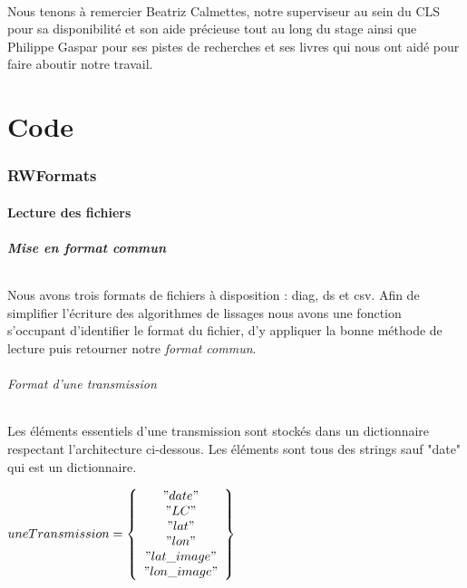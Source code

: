 \documentclass[11p, a4papert]{article}
\begin{document}
\paragraph{}
Nous tenons à remercier Beatriz Calmettes, notre superviseur au sein du CLS pour sa disponibilité et son aide précieuse tout au long du stage ainsi que Philippe Gaspar pour ses pistes de recherches et ses livres qui nous ont aidé pour faire aboutir notre travail.
\newpage
\part{Code}
\section{RWFormats}
\subsection{Lecture des fichiers}
\subsubsection{Mise en format commun}

\paragraph{}
Nous avons trois formats de fichiers à disposition : diag, ds et csv. Afin de simplifier l'écriture des algorithmes de lissages nous avons une fonction s'occupant d'identifier le format du fichier, d'y appliquer la bonne méthode de lecture puis retourner notre \emph{format commun}.

\paragraph{Format d'une transmission}
Les éléments essentiels d'une transmission sont stockés dans un dictionnaire respectant l'architecture ci-dessous. Les éléments sont tous des strings sauf "date" qui est un dictionnaire.
\vspace{1cm}
\begin{center}
$uneTransmission = \left\{\begin{array}{c} "date" \\"LC" \\"lat" \\"lon" \\"lat\_image" \\"lon\_image" \\ \end{array}\right\}$
\end{center}
\end{document}
